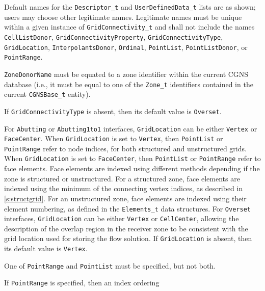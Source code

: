 \begin{notes}
\item Default names for the \texttt{Descriptor\_t} and
      \texttt{UserDefinedData\_t} lists are as shown; users may choose
      other legitimate names.
      Legitimate names must be unique within a given instance of
      \texttt{GridConnectivity\_t} and shall not include the names
      \texttt{CellListDonor}, \texttt{GridConnectivityProperty},
      \texttt{GridConnectivityType}, \texttt{GridLocation},
      \texttt{InterpolantsDonor}, \texttt{Ordinal}, \texttt{PointList},
      \texttt{PointListDonor}, or \texttt{PointRange}.
\item \texttt{ZoneDonorName} must be equated to a zone identifier
      within the current CGNS database (i.e., it must be equal to one
      of the \texttt{Zone\_t} identifiers contained in the current
      \texttt{CGNSBase\_t} entity).
\item If \texttt{GridConnectivityType} is absent, then its default value
      is \texttt{Overset}.
\item For \texttt{Abutting} or \texttt{Abutting1to1} interfaces,
      \texttt{GridLocation} can be either \texttt{Vertex} or
      \texttt{FaceCenter}.
      When \texttt{GridLocation} is set to \texttt{Vertex}, then
      \texttt{PointList} or \texttt{PointRange} refer to node indices,
      for both structured and unstructured grids.
      When \texttt{GridLocation} is set to \texttt{FaceCenter}, then
      \texttt{PointList} or \texttt{PointRange} refer to face elements.
      Face elements are indexed using different methods depending if the
      zone is structured or unstructured.
      For a structured zone, face elements are indexed using the
      minimum of the connecting vertex indices, as described in
      \autoref{s:structgrid}.
      For an unstructured zone, face elements are indexed using their
      element numbering, as defined in the \texttt{Elements\_t} data
      structures.
      For \texttt{Overset} interfaces, \texttt{GridLocation} can be
      either \texttt{Vertex} or \texttt{CellCenter}, allowing the
      description of the overlap region in the receiver zone to be
      consistent with the grid location used for storing the flow
      solution.
      If \texttt{GridLocation} is absent, then its default value is
      \texttt{Vertex}.
\item One of \texttt{PointRange} and \texttt{PointList} must be
      specified, but not both.
\item If \texttt{PointRange} is specified, then an index ordering

\end{notes}
